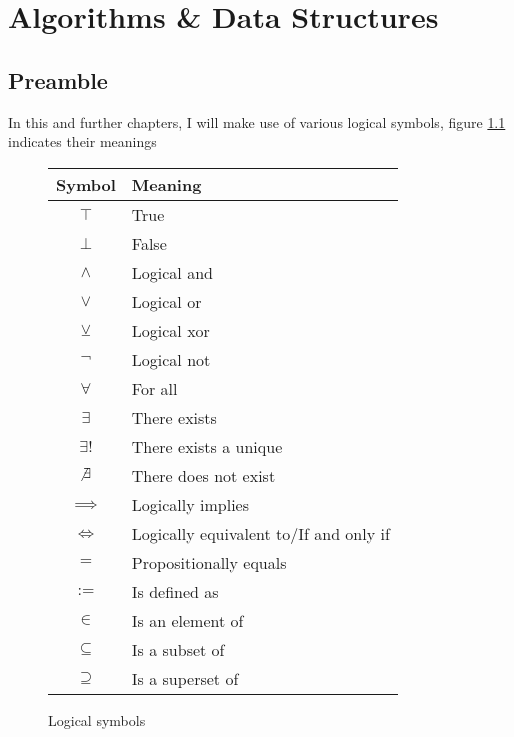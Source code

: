 \documentclass[11pt]{report}
\begin{document}
\chapter{Algorithms \& Data Structures}
\section*{Preamble}
In this and further chapters, I will make use of various logical symbols, figure \ref{fig:logicalSymbols} indicates their meanings
\begin{figure}[H]
    \caption{Logical symbols}
    \label{fig:logicalSymbols}
    \centering
    \begin{tabular}{|c|l|}
        \hline
        Symbol & Meaning \\
        \hline \hline
        $\top$ & True \\ \hline
        $\bot$ & False \\ \hline
        $\wedge$ & Logical and \\ \hline
        $\vee$ & Logical or \\ \hline
        $\veebar$ & Logical xor \\ \hline
        $\neg$ & Logical not \\ \hline
        $\forall$ & For all \\ \hline
        $\exists$ & There exists \\ \hline
        $\exists!$ & There exists a unique \\ \hline
        $\not\exists$ & There does not exist \\ \hline
        $\implies$ & Logically implies \\ \hline
        $\iff$ & Logically equivalent to/If and only if \\ \hline
        $=$ & Propositionally equals \\ \hline
        $:=$ & Is defined as \\ \hline
        $\in$ & Is an element of \\ \hline
        $\subseteq$ & Is a subset of \\ \hline
        $\supseteq$ & Is a superset of \\ \hline
    \end{tabular}
\end{figure}
\end{document}
